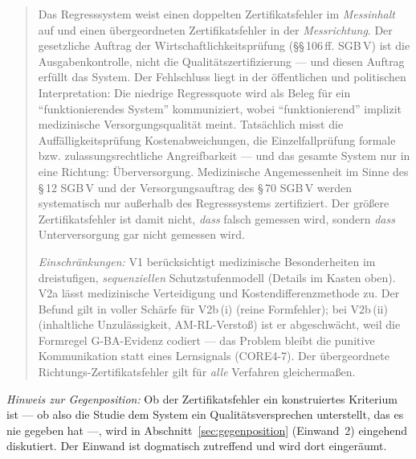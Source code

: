 \documentclass{umbruch-position}
\begin{document}
\begin{quote}
Das Regresssystem weist einen doppelten Zertifikatsfehler im \emph{Messinhalt} auf und einen \"ubergeordneten Zertifikatsfehler in der \emph{Messrichtung}. Der gesetzliche Auftrag der Wirtschaftlichkeitspr\"ufung (\S\S\,106\,ff. SGB\,V) ist die Ausgabenkontrolle, nicht die Qualit\"atszertifizierung --- und diesen Auftrag erf\"ullt das System. Der Fehlschluss liegt in der \"offentlichen und politischen Interpretation: Die niedrige Regressquote wird als Beleg f\"ur ein ``funktionierendes System'' kommuniziert, wobei ``funktionierend'' implizit medizinische Versorgungsqualit\"at meint. Tats\"achlich misst die Auff\"alligkeitspr\"ufung Kostenabweichungen, die Einzelfallpr\"ufung formale bzw. zulassungsrechtliche Angreifbarkeit --- und das gesamte System nur in eine Richtung: \"Uberversorgung. Medizinische Angemessenheit im Sinne des \S\,12 SGB\,V und der Versorgungsauftrag des \S\,70 SGB\,V werden systematisch nur au\ss{}erhalb des Regresssystems zertifiziert. Der gr\"o\ss{}ere Zertifikatsfehler ist damit nicht, \emph{dass} falsch gemessen wird, sondern \emph{dass} Unterversorgung gar nicht gemessen wird.

\smallskip\noindent\textit{Einschr\"ankungen:} V1 ber\"ucksichtigt medizinische Besonderheiten im dreistufigen, \emph{sequenziellen} Schutzstufenmodell (Details im Kasten oben). V2a l\"asst medizinische Verteidigung und Kostendifferenzmethode zu. Der Befund gilt in voller Sch\"arfe f\"ur V2b\,(i) (reine Formfehler); bei V2b\,(ii) (inhaltliche Unzul\"assigkeit, AM-RL-Versto\ss{}) ist er abgeschw\"acht, weil die Formregel G-BA-Evidenz codiert --- das Problem bleibt die punitive Kommunikation statt eines Lernsignals (CORE4-7). Der \"ubergeordnete Richtungs-Zertifikatsfehler gilt f\"ur \emph{alle} Verfahren gleicherma\ss{}en.
\end{quote}

\noindent\textit{Hinweis zur Gegenposition:} Ob der Zertifikatsfehler ein konstruiertes Kriterium ist --- ob also die Studie dem System ein Qualitätsversprechen unterstellt, das es nie gegeben hat ---, wird in Abschnitt~\ref{sec:gegenposition} (Einwand~2) eingehend diskutiert. Der Einwand ist dogmatisch zutreffend und wird dort eingeräumt.
\end{document}
